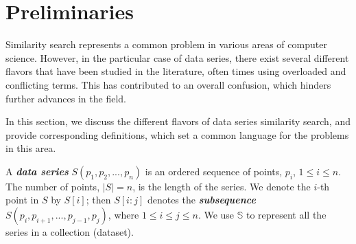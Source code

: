 \section{Preliminaries}
\label{sec:problem}


Similarity search represents a common problem in various areas of computer science.
However, in the particular case of data series, there exist several different flavors that have been studied in the literature, often times using overloaded and conflicting terms.
This has contributed to an overall confusion, which hinders further advances in the field.

In this section, we discuss the different flavors of data series similarity search, and provide corresponding definitions, which set a common language for the problems in this area.

A \textit{\textbf{data series}} $S(p_1,p_2,...,p_n)$ is an ordered sequence of points, $p_i$, $1 \leq i \leq n$.
The number of points, $|S|=n$, is the length of the series.
We denote the $i$-th point in $S$ by $S[i]$; then $S[i:j]$ denotes the \textit{\textbf{subsequence}} $S(p_i,p_{i+1},...,p_{j-1},p_j)$, where $1 \leq i \leq j \leq n$.
We use $\mathbb{S}$ to represent all the series in a collection (dataset).

